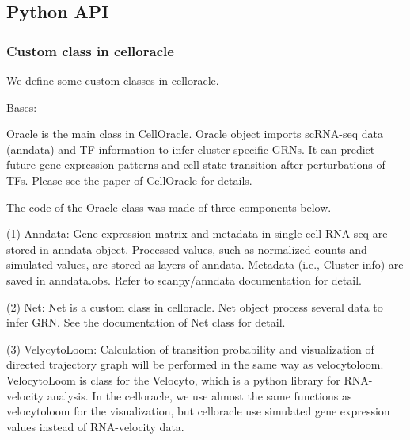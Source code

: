 \documentclass[letterpaper,10pt,english]{sphinxmanual}
\begin{document}
\subsection{Python API}
\label{\detokenize{modules/index:python-api}}

\subsubsection{Custom class in celloracle}
\label{\detokenize{modules/celloracle:custom-class-in-celloracle}}\label{\detokenize{modules/celloracle::doc}}
We define some custom classes in celloracle.

\label{\detokenize{modules/celloracle:module-celloracle}}

\begin{fulllineitems}
\label{\detokenize{modules/celloracle:celloracle.Oracle}}
Bases: 

Oracle is the main class in CellOracle.
Oracle object imports scRNA-seq data (anndata) and TF information to infer cluster-specific GRNs.
It can predict future gene expression patterns and cell state transition after perturbations of TFs.
Please see the paper of CellOracle for details.

The code of the Oracle class was made of three components below.

(1) Anndata:  Gene expression matrix and metadata in single-cell RNA-seq are stored in anndata object.
Processed values, such as normalized counts and simulated values, are stored as layers of anndata.
Metadata (i.e., Cluster info) are saved in anndata.obs. Refer to scanpy/anndata documentation for detail.

(2) Net: Net is a custom class in celloracle.
Net object process several data to infer GRN.
See the documentation of Net class for detail.

(3) VelycytoLoom: Calculation of transition probability and visualization of directed trajectory graph will be performed in the same way as velocytoloom.
VelocytoLoom is class for the Velocyto, which is a python library for RNA-velocity analysis.
In the celloracle, we use almost the same functions as velocytoloom for the visualization, but celloracle use simulated gene expression values instead of RNA-velocity data.


\end{fulllineitems}
\end{document}
